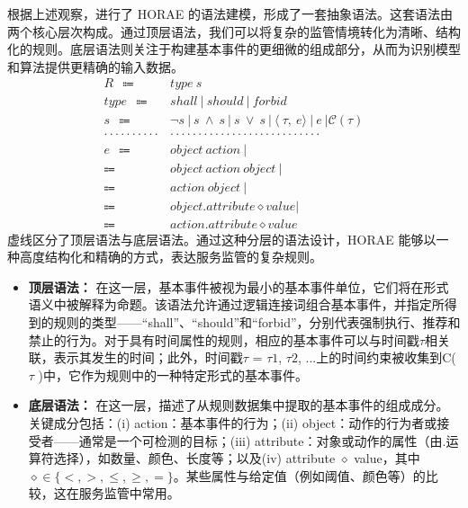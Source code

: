 根据上述观察，进行了 HORAE 的语法建模，形成了一套抽象语法。这套语法由两个核心层次构成。通过顶层语法，我们可以将复杂的监管情境转化为清晰、结构化的规则。底层语法则关注于构建基本事件的更细微的组成部分，从而为识别模型和算法提供更精确的输入数据。
\begin{align*}
    R \ \  \Coloneqq \ \  & type~s \tag{typed rule}\\
    type \ \  \Coloneqq \ \  & shall~|~should~|~forbid \tag{predefined types}\\
    s \ \  \Coloneqq \ \  &  \neg s~|~s~ \land~ s ~|~s~ \lor~ s ~|~
    \langle~\tau,~e \rangle~|~e~|\mathcal{C}(\tau) \tag{statement}\\
    \cdot \cdot \cdot \cdot\cdot\cdot\cdot\cdot\cdot\cdot & \cdot\cdot\cdot\cdot\cdot\cdot\cdot\cdot\cdot\cdot\cdot\cdot\cdot\cdot\cdot\cdot\cdot\cdot \cdot \cdot \cdot \cdot \cdot \cdot \cdot \cdot\cdot\\
    e \ \  \Coloneqq \ \  & object~action~| \tag{patterned event}\\
    \Coloneqq \ \  & object~action~object~|\\
    \Coloneqq \ \  & action~object~|\\
    \Coloneqq \ \  & object. attribute \diamond value|\\
    \Coloneqq \ \  & action. attribute \diamond value
\end{align*}
虚线区分了顶层语法与底层语法。通过这种分层的语法设计，HORAE 能够以一种高度结构化和精确的方式，表达服务监管的复杂规则。



\begin{itemize}
    \item \textbf{顶层语法：} 在这一层，基本事件被视为最小的基本事件单位，它们将在形式语义中被解释为命题。该语法允许通过逻辑连接词组合基本事件，并指定所得到的规则的类型——“shall”、“should”和“forbid”，分别代表强制执行、推荐和禁止的行为。对于具有时间属性的规则，相应的基本事件可以与时间戳$\tau$相关联，表示其发生的时间；此外，时间戳$\tau$ = {$\tau1$, $\tau2$, ...}上的时间约束被收集到C($\tau$ )中，它作为规则中的一种特定形式的基本事件。
    \item \textbf{底层语法：} 在这一层，描述了从规则数据集中提取的基本事件的组成成分。关键成分包括：(i) action：基本事件的行为；(ii) object：动作的行为者或接受者——通常是一个可检测的目标；(iii) attribute：对象或动作的属性（由.运算符选择），如数量、颜色、长度等；以及(iv) attribute $\diamond$ value，其中$\diamond \in \{<, >, \leq, \geq, =\}$。某些属性与给定值（例如阈值、颜色等）的比较，这在服务监管中常用。
\end{itemize}

